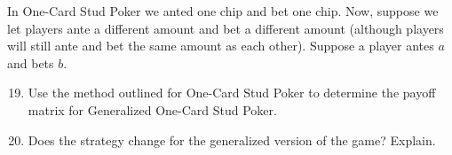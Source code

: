 In One-Card Stud Poker we  anted one chip and bet one chip. Now, suppose we let players ante a different amount and bet  a different amount (although players will still ante and bet the same amount as each other). Suppose a player antes $a$ and bets $b$. 

\vspace{.1in}

\begin{enumerate}
\setcounter{enumi}{18}
\item Use the method outlined for One-Card Stud Poker to determine the payoff matrix for Generalized One-Card Stud Poker. 
\vspace{.1in}


\item Does the strategy change for the generalized version of the game? Explain.
\vspace{.1in}
\end{enumerate}

